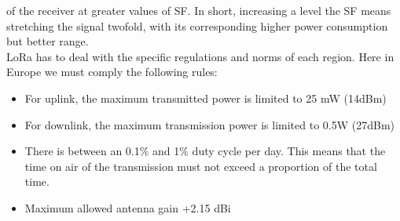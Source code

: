 of the receiver at greater values of SF. In short, increasing a level the
SF means stretching the signal twofold, with its corresponding higher
power consumption but better range.\\
LoRa has to deal with the specific regulations and norms of each region.
Here in Europe we must comply the following rules:
\begin{itemize}
   \item For uplink, the maximum transmitted power is limited to 25 mW
(14dBm) 
    \item For downlink, the maximum transmission power is limited to 0.5W
(27dBm)
    \item There is between an 0.1\% and 1\% duty cycle per day. This means
that the time on air of the transmission must not exceed a
proportion of the total time.
    \item Maximum allowed antenna gain +2.15 dBi
\end{itemize}
